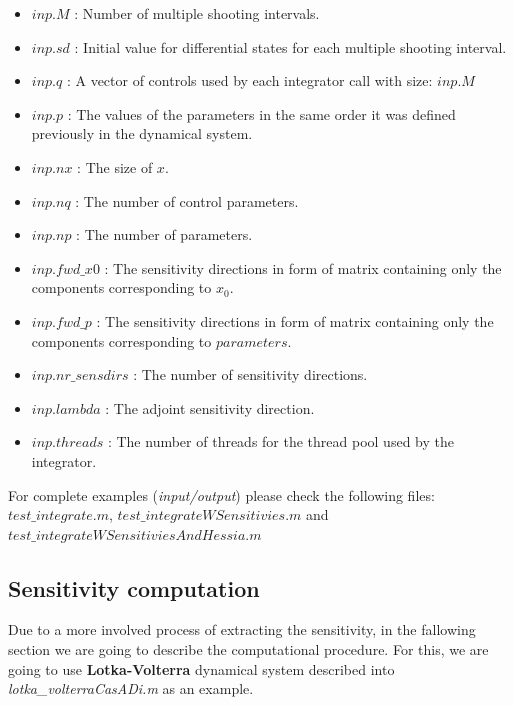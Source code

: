 \documentclass[12pt, letterpaper]{article}
\begin{document}
\begin{itemize} 
	\item $inp.M$ : Number of  multiple shooting intervals.

	\item $inp.sd$ : Initial value for differential states for each multiple shooting interval.
	
	\item $inp.q$ : A vector of controls used by each integrator call with size: $inp.M$

	\item $inp.p$ : The values of the parameters in the same order it was defined previously in the dynamical system.


	\item $inp.nx$ : The size of $x$.
	\item $inp.nq$ : The number of control parameters.
	\item $inp.np$ : The number of parameters.
	\item $inp.fwd\_x0$ : The sensitivity directions in form of matrix containing only the components corresponding to $x_0$.
	\item $inp.fwd\_p$ : The sensitivity directions in form of matrix containing only the components corresponding to $parameters$.
	\item $inp.nr\_sensdirs$ : The number of sensitivity directions.
	\item $inp.lambda$ : The adjoint sensitivity direction.
	\item $inp.threads$ : The number of threads for the thread pool used by the integrator.
\end{itemize}

For complete examples (\textit{input/output}) please check the following files: $test\_integrate.m$, $test\_integrateWSensitivies.m$ and \\
$test\_integrateWSensitiviesAndHessia.m$

\iffalse

\subsection{Sensitivity computation}

\label{label_sensitivity_computation}

Due to a more involved process of extracting the sensitivity, in the fallowing section we are going to describe the computational procedure. For this, we are going to use \textbf{Lotka-Volterra} dynamical system described into \textit{lotka\_volterraCasADi.m} as an example.
\end{document}
